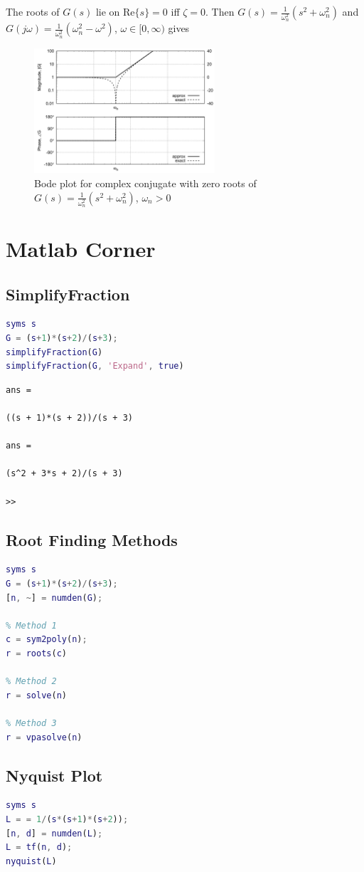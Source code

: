 \documentclass[letterpaper,12pt]{article}
\begin{document}
The roots of $G(s)$ lie on Re$\{s\} = 0$ iff $\zeta = 0$. Then $G(s) = \frac{1}{\omega_{n}^2} (s^2 + \omega_n^2)$ and 
$G(j \omega) = \frac{1}{\omega_{n}^2} (\omega_n^2 - \omega^2)$, $\omega \in [0, \infty)$ gives 
\begin{figure}[h]
    \centering
    \includegraphics[width=0.6\textwidth]{case8 complex conjucate zero.png}
    \caption{Bode plot for complex conjugate with zero roots of $G(s) = \frac{1}{\omega_{n}^2} 
    (s^2 + \omega_n^2)$, $\omega_n > 0$}
\end{figure}


\FloatBarrier



\section{Matlab Corner}
\subsection{SimplifyFraction}
\begin{lstlisting}[language=Matlab]
syms s
G = (s+1)*(s+2)/(s+3);
simplifyFraction(G)
simplifyFraction(G, 'Expand', true)
\end{lstlisting}
\begin{verbatim}
ans =

((s + 1)*(s + 2))/(s + 3)

ans =

(s^2 + 3*s + 2)/(s + 3)

>> 
\end{verbatim}

\subsection{Root Finding Methods}
\begin{lstlisting}[language=Matlab]
syms s
G = (s+1)*(s+2)/(s+3);
[n, ~] = numden(G);

% Method 1  
c = sym2poly(n);
r = roots(c)

% Method 2
r = solve(n)

% Method 3
r = vpasolve(n)
\end{lstlisting}

\subsection{Nyquist Plot}
\begin{lstlisting}[language=Matlab]
syms s
L = = 1/(s*(s+1)*(s+2));
[n, d] = numden(L);
L = tf(n, d);
nyquist(L)
\end{lstlisting}
\end{document}
